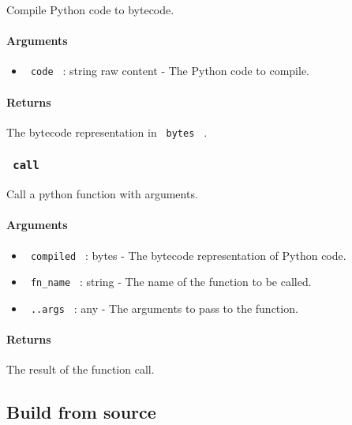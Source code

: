 Compile Python code to bytecode.

\paragraph{Arguments}\label{arguments-1}

\begin{itemize}
\tightlist
\item
  \texttt{\ code\ } : string \textbar{} raw content - The Python code to
  compile.
\end{itemize}

\paragraph{Returns}\label{returns-1}

The bytecode representation in \texttt{\ bytes\ } .

\subsubsection{\texorpdfstring{\texttt{\ call\ }}{ call }}\label{call}

Call a python function with arguments.

\paragraph{Arguments}\label{arguments-2}

\begin{itemize}
\tightlist
\item
  \texttt{\ compiled\ } : bytes - The bytecode representation of Python
  code.
\item
  \texttt{\ fn\_name\ } : string - The name of the function to be
  called.
\item
  \texttt{\ ..args\ } : any - The arguments to pass to the function.
\end{itemize}

\paragraph{Returns}\label{returns-2}

The result of the function call.

\subsection{Build from source}\label{build-from-source}

